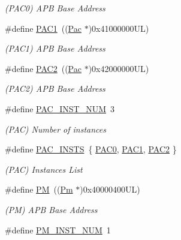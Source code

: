 \begin{DoxyCompactItemize}
\begin{DoxyCompactList}\small\item\em (P\+A\+C0) A\+PB Base Address \end{DoxyCompactList}\item 
\#define \mbox{\hyperlink{group___s_a_m_d21_g15_l__base_gabb124870d8c9b22f4aa20dde26757c1d}{P\+A\+C1}}~((\mbox{\hyperlink{struct_pac}{Pac}}      $\ast$)0x41000000\+U\+L)
\begin{DoxyCompactList}\small\item\em (P\+A\+C1) A\+PB Base Address \end{DoxyCompactList}\item 
\#define \mbox{\hyperlink{group___s_a_m_d21_g15_l__base_gae177007ea320b0310a48d5810028ecab}{P\+A\+C2}}~((\mbox{\hyperlink{struct_pac}{Pac}}      $\ast$)0x42000000\+U\+L)
\begin{DoxyCompactList}\small\item\em (P\+A\+C2) A\+PB Base Address \end{DoxyCompactList}\item 
\#define \mbox{\hyperlink{group___s_a_m_d21_g15_l__base_ga42bad78810a2b438b30d2c321bcfacd7}{P\+A\+C\+\_\+\+I\+N\+S\+T\+\_\+\+N\+UM}}~3
\begin{DoxyCompactList}\small\item\em (P\+AC) Number of instances \end{DoxyCompactList}\item 
\#define \mbox{\hyperlink{group___s_a_m_d21_g15_l__base_ga55eb07e1f77514010d2b832ebe1c99a5}{P\+A\+C\+\_\+\+I\+N\+S\+TS}}~\{ \mbox{\hyperlink{group___s_a_m_d21_j18_a__base_ga193491199100ba87dcdbb8d50837fb62}{P\+A\+C0}}, \mbox{\hyperlink{group___s_a_m_d21_j18_a__base_gabb124870d8c9b22f4aa20dde26757c1d}{P\+A\+C1}}, \mbox{\hyperlink{group___s_a_m_d21_j18_a__base_gae177007ea320b0310a48d5810028ecab}{P\+A\+C2}} \}
\begin{DoxyCompactList}\small\item\em (P\+AC) Instances List \end{DoxyCompactList}\item 
\#define \mbox{\hyperlink{group___s_a_m_d21_g15_l__base_ga23c7d58108d99a089ce0824823e6b950}{PM}}~((\mbox{\hyperlink{struct_pm}{Pm}}       $\ast$)0x40000400\+U\+L)
\begin{DoxyCompactList}\small\item\em (PM) A\+PB Base Address \end{DoxyCompactList}\item 
\#define \mbox{\hyperlink{group___s_a_m_d21_g15_l__base_gaa9ae00107674dbef876c5f1d19033054}{P\+M\+\_\+\+I\+N\+S\+T\+\_\+\+N\+UM}}~1

\end{DoxyCompactItemize}
